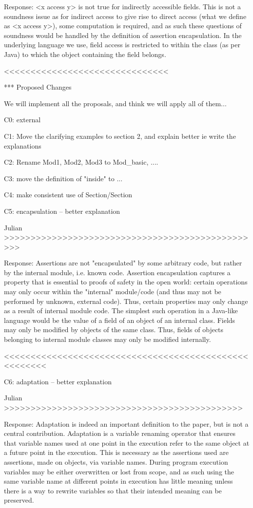 Response: <x access y> is not true for indirectly accessible fields. This is not a soundness issue as for indirect access to give rise to direct access (what we define as <x access y>), some computation is required, and as such these questions of soundness would be handled by the definition of assertion encapsulation. In the underlying language we use, field access is restricted to within the class (as per Java) to which the object containing the field belongs.

<<<<<<<<<<<<<<<<<<<<<<<<<<<<<<<


*** Proposed Changes

We will implement all the proposals, and think we will apply all of them...

C0: external

C1: Move the clarifying examples to section 2, and explain better
ie write the explanations

C2: Rename Mod1, Mod2, Mod3 to Mod_{basic}, ....

C3: move the definition of "inside" to ...

C4: make consistent use of Section/Section

C5: encapsulation -- better explanation

Julian >>>>>>>>>>>>>>>>>>>>>>>>>>>>>>>>>>>>>>>>>>>>>>>>>

Response:
Assertions are not "encapsulated" by some arbitrary code, but rather by the internal module, i.e. known code. Assertion encapsulation captures a property that is essential to proofs of safety in the open world: certain operations may only occur within the "internal" module/code (and thus may not be performed by unknown, external code). Thus, certain properties may only change as a result of internal module code. The simplest such operation in a Java-like language would be the value of a field of an object of an internal class. Fields may only be modified by objects of the same class. Thus, fields of objects belonging to internal module classes may only be modified internally.

<<<<<<<<<<<<<<<<<<<<<<<<<<<<<<<<<<<<<<<<<<<<<<<<<<<<<<

C6: adaptation -- better explanation

Julian >>>>>>>>>>>>>>>>>>>>>>>>>>>>>>>>>>>>>>>>>>>>>

Response:
Adaptation is indeed an important definition to the paper, but is not a central contribution. Adaptation is a variable renaming operator that ensures that variable names used at one point in the execution refer to the same object at a future point in the execution. This is necessary as the assertions used are assertions, made on objects, via variable names. During program execution variables may be either overwritten or lost from scope, and as such using the same variable name at different points in execution has little meaning unless there is a way to rewrite variables so that their intended meaning can be preserved. 

